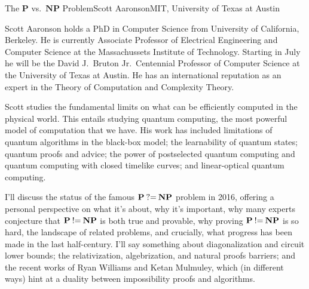 \documentclass{hrumc}
\begin{document}
\vspace*{5ex}
\begin{plenary}{The $\mathbf{P}$ vs.\ $\mathbf{NP}$ Problem}{Scott Aaronson}{MIT, University of Texas at Austin}{Scott Aaronson 
holds a PhD in Computer Science from University of California, Berkeley.
He is currently Associate Professor of Electrical Engineering and 
Computer Science
at the Massachussets Institute of Technology. 
Starting in July he will be the 
David J.~Bruton Jr.\ Centennial Professor of Computer Science at the 
University of Texas at Austin. 
He has an international reputation as an expert in the Theory of Computation 
and Complexity Theory.

Scott studies the fundamental limits on what can be efficiently computed in the physical world. This entails studying quantum computing, the most powerful model of computation that we have. His work has included limitations of quantum algorithms in the black-box model; the learnability of quantum states; quantum proofs and advice; the power of postselected quantum computing and quantum computing with closed timelike curves; and linear-optical quantum computing.}

I'll discuss the status of the famous $\mathbf{P}\mathbin{\hbox{?=}}\mathbf{NP}$ 
problem in 2016, offering
a personal perspective on what it's about, why it's important, why
many experts conjecture that $\mathbf{P}\mathbin{\hbox{!=}}\mathbf{NP}$ is both true and provable, why
proving $\mathbf{P}\mathbin{\hbox{!=}}\mathbf{NP}$ is so hard, the landscape of related problems, and
crucially, what progress has been made in the last half-century.  I'll
say something about diagonalization and circuit lower bounds; the
relativization, algebrization, and natural proofs barriers; and the
recent works of Ryan Williams and Ketan Mulmuley, which (in different
ways) hint at a duality between impossibility proofs and algorithms.
\end{plenary}
\vspace*{1ex plus 1fill}


\restoregeometry






\end{document}
